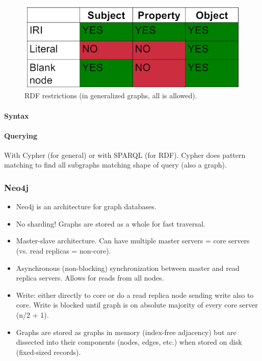 \begin{figure}[h]
	\centering
	\includegraphics[scale=0.5]{images/3-rdf.PNG}
	\caption{RDF restrictions (in generalized graphs, all is allowed).}
	\label{fig:rdf}
\end{figure}

\paragraph{Syntax}

\paragraph{Querying}
With Cypher (for general) or with SPARQL (for RDF). Cypher does pattern matching to find all subgraphs matching shape of query (also a graph).



\subsubsection{Neo4j}

\begin{itemize}
    \item Neo4j is an architecture for graph databases. 
    \item No sharding! Graphs are stored as a whole for fast traversal.
    \item Master-slave architecture. Can have multiple master servers = core servers (vs. read replicas = non-core).
    \item Asynchronous (non-blocking) synchronization between master and read replica servers. Allows for reads from all nodes.
    \item Write: either directly to core or do a read replica node sending write also to core. Write is blocked until graph is on absolute majority of every core server (n/2 + 1).
    \item Graphs are stored as graphs in memory (index-free adjacency) but are dissected into their components (nodes, edges, etc.) when stored on disk (fixed-sized records).
\end{itemize}

